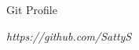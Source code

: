 \documentclass{resume} %
\begin{document}
\begin{rSection}{Git Profile}
\item \textit{https://github.com/SattyS}
\end{rSection}









\end{document}
